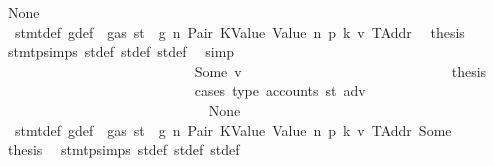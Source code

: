 \begin{isabellebody}
\ None\isanewline
\ \ \ \ \ \ \ \ \ \ \ \ \ \ \ \ \ \ \ \ \ \ \ \ \ \ \isamarkupfalse%
\ {}{\isacharparenleft}{\kern0pt}{}{\isacharparenright}{\kern0pt}\ stmt{\isacharunderscore}{\kern0pt}def\ g{\isacharunderscore}{\kern0pt}def\ {\isacharbackquoteopen}{\isasymnot}\ gas\ st\ {\isasymle}\ g{\isacharbackquoteclose}\ n\ Pair\ KValue\ Value\ n{}\ p{}\ k{}\ v{}\ TAddr\ \isamarkupfalse%
\ {\isacharquery}{\kern0pt}thesis\ \isamarkupfalse%
\ stmt{\isachardot}{\kern0pt}psimps{\isacharparenleft}{\kern0pt}{}{\isacharparenright}{\kern0pt}\ st{\isacharprime}{\kern0pt}{\isacharunderscore}{\kern0pt}def\ st{\isacharprime}{\kern0pt}{\isacharprime}{\kern0pt}{\isacharunderscore}{\kern0pt}def\ st{\isacharprime}{\kern0pt}{\isacharprime}{\kern0pt}{\isacharprime}{\kern0pt}{\isacharunderscore}{\kern0pt}def\ \isamarkupfalse%
\ simp\isanewline
\ \ \ \ \ \ \ \ \ \ \ \ \ \ \ \ \ \ \ \ \ \ \ \ \isamarkupfalse%
\isanewline
\ \ \ \ \ \ \ \ \ \ \ \ \ \ \ \ \ \ \ \ \ \ \ \ \ \ \isamarkupfalse%
\ {\isacharparenleft}{\kern0pt}Some\ v{\isacharprime}{\kern0pt}{\isacharparenright}{\kern0pt}\isanewline
\ \ \ \ \ \ \ \ \ \ \ \ \ \ \ \ \ \ \ \ \ \ \ \ \ \ \isamarkupfalse%
\ \isamarkupfalse%
\ {\isacharquery}{\kern0pt}thesis\isanewline
\ \ \ \ \ \ \ \ \ \ \ \ \ \ \ \ \ \ \ \ \ \ \ \ \ \ \isamarkupfalse%
\ {\isacharparenleft}{\kern0pt}cases\ {\isachardoublequoteopen}type\ {\isacharparenleft}{\kern0pt}accounts\ st{\isacharprime}{\kern0pt}{\isacharprime}{\kern0pt}{\isacharprime}{\kern0pt}\ adv{\isacharparenright}{\kern0pt}{\isachardoublequoteclose}{\isacharparenright}{\kern0pt}\isanewline
\ \ \ \ \ \ \ \ \ \ \ \ \ \ \ \ \ \ \ \ \ \ \ \ \ \ \ \ \isamarkupfalse%
\ None\isanewline
\ \ \ \ \ \ \ \ \ \ \ \ \ \ \ \ \ \ \ \ \ \ \ \ \ \ \ \ \isamarkupfalse%
\ {}{\isacharparenleft}{\kern0pt}{}{\isacharparenright}{\kern0pt}\ stmt{\isacharunderscore}{\kern0pt}def\ g{\isacharunderscore}{\kern0pt}def\ {\isacharbackquoteopen}{\isasymnot}\ gas\ st\ {\isasymle}\ g{\isacharbackquoteclose}\ n\ Pair\ KValue\ Value\ n{}\ p{}\ k{}\ v{}\ TAddr\ Some\ \isamarkupfalse%
\ {\isacharquery}{\kern0pt}thesis\ \isamarkupfalse%
\ stmt{\isachardot}{\kern0pt}psimps{\isacharparenleft}{\kern0pt}{}{\isacharparenright}{\kern0pt}\ st{\isacharprime}{\kern0pt}{\isacharunderscore}{\kern0pt}def\ st{\isacharprime}{\kern0pt}{\isacharprime}{\kern0pt}{\isacharunderscore}{\kern0pt}def\ st{\isacharprime}{\kern0pt}{\isacharprime}{\kern0pt}{\isacharprime}{\kern0pt}{\isacharunderscore}{\kern0pt}def\ \isamarkupfalse%

\end{isabellebody}
